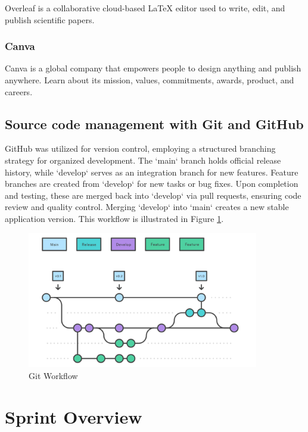 Overleaf is a collaborative cloud-based LaTeX editor used to write, edit, and publish scientific papers.

\subsubsection*{\protect{} Canva}

Canva is a global company that empowers people to design anything and publish anywhere. Learn about its mission, values, commitments, awards, product, and careers.


\subsection{Source code management with Git and GitHub}
GitHub was utilized for version control, employing a structured branching strategy for organized development. The `main` branch holds official release history, while `develop` serves as an integration branch for new features. Feature branches are created from `develop` for new tasks or bug fixes. Upon completion and testing, these are merged back into `develop` via pull requests, ensuring code review and quality control. Merging `develop` into `main` creates a new stable application version. This workflow is illustrated in Figure \ref{fig:git-workflow}.

\begin{figure}[ht!]
    \centering
    \includegraphics[width=0.9\textwidth]{images/gitWorkflow.png}
    \caption{Git Workflow}
    \label{fig:git-workflow}
\end{figure}


\section{Sprint Overview}


